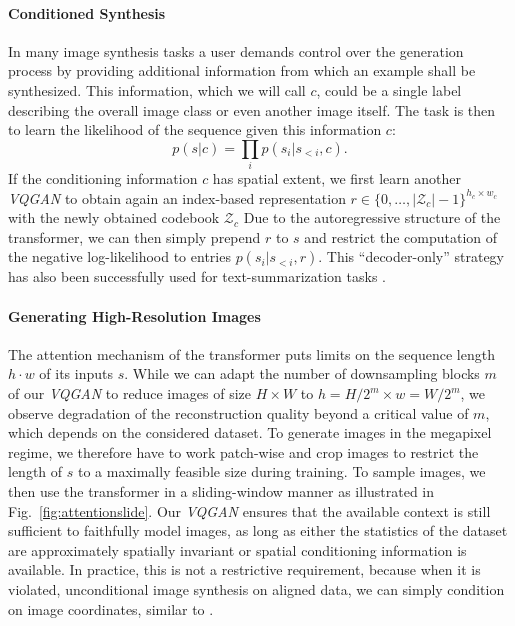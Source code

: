 \documentclass[final]{cvpr}
\newcommand{\codebook}{\mathcal{Z}}
\begin{document}
\paragraph{Conditioned Synthesis}
%
In many image synthesis tasks a user demands control over the generation
process by providing additional information from which an example shall be
synthesized.
This information, which we will call $c$, could be a single label describing the
overall image class or even another image itself.
The task is then to learn the likelihood of the sequence given this information $c$:
\begin{equation}
  \label{eq:conddensity}
  p(s|c) = \prod_i p(s_i|s_{<i}, c).
\end{equation}
%
If the conditioning information $c$ has spatial extent, we first learn another \emph{VQGAN} to obtain
again an index-based representation $r \in \{0, \dots, \vert \codebook_c \vert
-1 \}^{h_c \times w_c}$ with the newly obtained codebook $\codebook_c$
%
%
Due to the autoregressive structure of the transformer, we can then simply prepend $r$ to $s$ and
restrict the computation of the negative log-likelihood to entries
$p(s_i \vert s_{<i}, r)$. This ``decoder-only'' strategy has also been
successfully used for text-summarization tasks \cite{liu2018generating}.

\paragraph{Generating High-Resolution Images}
%
%
\attentionslide
The attention mechanism of the transformer puts limits on the sequence length
$h \cdot w$ of its inputs $s$. While we can adapt the number of downsampling
blocks $m$ of our \emph{VQGAN} to reduce images of size $H\times W$ to $h=H/2^m
\times w=W/2^m$, we observe degradation of the reconstruction quality beyond a
critical value of $m$, which depends on the considered dataset. To generate
images in the megapixel regime, we therefore have to work patch-wise and crop images to restrict the length of $s$ to a maximally
feasible size during training. To sample images, we then use the transformer in a
sliding-window manner as illustrated in Fig.~\ref{fig:attentionslide}.
Our \emph{VQGAN} ensures that the available context is still
sufficient to faithfully model images, as long as either the statistics of the
dataset are approximately spatially invariant or spatial conditioning
information is available. In practice, this is not a restrictive requirement,
because when it is violated, \ie unconditional image synthesis on
aligned data, we can simply condition on image coordinates, similar to
\cite{lin2019cocogan}.
\end{document}
